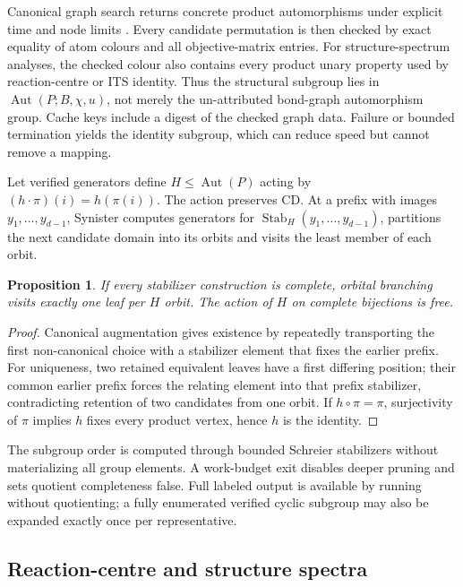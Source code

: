 \documentclass[11pt]{article}
\newtheorem{proposition}{Proposition}
\newcommand{\Aut}{\operatorname{Aut}}
\newcommand{\Stab}{\operatorname{Stab}}
\begin{document}
Canonical graph search returns concrete product automorphisms under explicit
time and node limits \citep{mckay2014nauty}.  Every candidate permutation is
then checked by exact equality of atom colours and all objective-matrix
entries.  For structure-spectrum analyses, the checked colour also contains
every product unary property used by reaction-centre or ITS identity.  Thus
the structural subgroup lies in $\Aut(P;B,\chi,u)$, not merely the un-attributed
bond-graph automorphism group.  Cache keys include a digest of the checked
graph data.  Failure or bounded termination yields the identity subgroup,
which can reduce speed but cannot remove a mapping.

Let verified generators define $H\leq\Aut(P)$ acting by
$(h\cdot\pi)(i)=h(\pi(i))$.  The action preserves CD.  At a prefix with images
$y_1,\ldots,y_{d-1}$, Synister computes generators for
$\Stab_H(y_1,\ldots,y_{d-1})$, partitions the next candidate domain into its
orbits and visits the least member of each orbit.

\begin{proposition}
If every stabilizer construction is complete, orbital branching visits exactly
one leaf per $H$ orbit.  The action of $H$ on complete bijections is free.
\end{proposition}

\begin{proof}
Canonical augmentation gives existence by repeatedly transporting the first
non-canonical choice with a stabilizer element that fixes the earlier prefix.
For uniqueness, two retained equivalent leaves have a first differing
position; their common earlier prefix forces the relating element into that
prefix stabilizer, contradicting retention of two candidates from one orbit.
If $h\circ\pi=\pi$, surjectivity of $\pi$ implies $h$ fixes every product
vertex, hence $h$ is the identity.
\end{proof}

The subgroup order is computed through bounded Schreier stabilizers without
materializing all group elements.  A work-budget exit disables deeper pruning
and sets quotient completeness false.  Full labeled output is available by
running without quotienting; a fully enumerated verified cyclic subgroup may
also be expanded exactly once per representative.

\subsection*{Reaction-centre and structure spectra}
\end{document}
